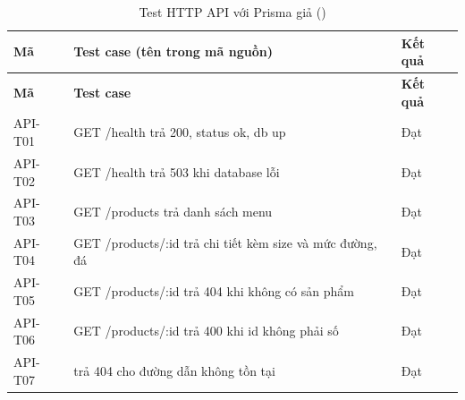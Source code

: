 {\small
\begin{longtable}{@{}L{1.9cm}L{10.6cm}L{1.3cm}@{}}
\caption{Test HTTP API với Prisma giả ()}\label{tab:apit}\\
\toprule
\textbf{Mã} & \textbf{Test case (tên trong mã nguồn)} & \textbf{Kết quả} \\ \midrule \endfirsthead
\toprule \textbf{Mã} & \textbf{Test case} & \textbf{Kết quả} \\ \midrule \endhead
\bottomrule \endfoot
API-T01 & GET /health trả 200, status ok, db up & Đạt \\
API-T02 & GET /health trả 503 khi database lỗi & Đạt \\
API-T03 & GET /products trả danh sách menu & Đạt \\
API-T04 & GET /products/:id trả chi tiết kèm size và mức đường, đá & Đạt \\
API-T05 & GET /products/:id trả 404 khi không có sản phẩm & Đạt \\
API-T06 & GET /products/:id trả 400 khi id không phải số & Đạt \\
API-T07 & trả 404 cho đường dẫn không tồn tại & Đạt \\
\end{longtable}
}